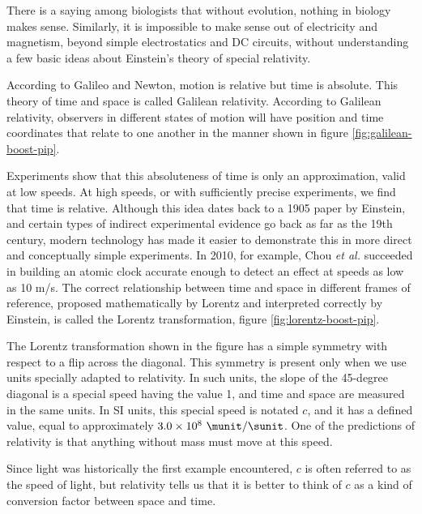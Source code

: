 There is a saying among biologists that without evolution, nothing in biology
makes sense. Similarly, it is impossible to make sense out of electricity and
magnetism, beyond simple electrostatics and DC circuits, without understanding
a few basic ideas about Einstein's theory of special relativity.

According to Galileo and Newton, motion is relative but time is absolute.
This theory of time and space is called Galilean relativity. According to
Galilean relativity, observers in different states of motion will have position
and time coordinates that relate to one another in the manner shown in
figure \ref{fig:galilean-boost-pip}.


Experiments show that this absoluteness of time is only an
approximation, valid at low speeds. At high speeds, or with
sufficiently precise experiments, we find that time is relative.
Although this idea dates back to a 1905 paper by Einstein, and certain
types of indirect experimental evidence go back as far as the 19th
century, modern technology has made it easier to demonstrate this in
more direct and conceptually simple experiments. In 2010, for example,
Chou \emph{et al.} succeeded in building an atomic clock accurate
enough to detect an effect at speeds as low as 10 m/s. The correct
relationship between time and space in different frames of reference,
proposed mathematically by Lorentz and interpreted correctly by Einstein,
is called the Lorentz transformation, figure \ref{fig:lorentz-boost-pip}.


The Lorentz transformation shown in the figure has a simple symmetry with
respect to a flip across the diagonal. This symmetry is present only
when we use units specially adapted to relativity. In such units, the
slope of the 45-degree diagonal is a special speed having the value 1,
and time and space are measured in the same units. In SI units, this
special speed is notated $c$, and it has a defined value, equal to
approximately $3.0\times10^8\ \munit/\sunit$. One of the predictions of
relativity is that anything without mass must move at this speed. 

Since
light was historically the first example encountered, $c$ is often referred
to as the speed of light, but relativity tells us that it is better to think
of $c$ as a kind of conversion factor between space and time.

